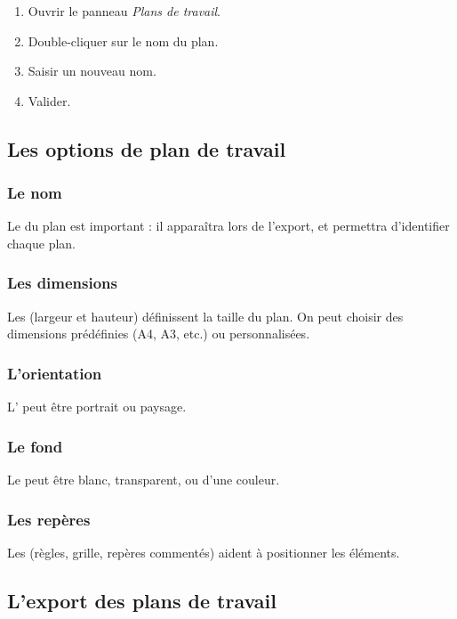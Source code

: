 \begin{enumerate}
    \item Ouvrir le panneau \emph{Plans de travail}.
    \item Double-cliquer sur le nom du plan.
    \item Saisir un nouveau nom.
    \item Valider.
\end{enumerate}

\subsection{Les options de plan de travail}

\subsubsection{Le nom}

Le  du plan est important : il apparaîtra lors de l'export, et permettra d'identifier chaque plan.

\subsubsection{Les dimensions}

Les  (largeur et hauteur) définissent la taille du plan. On peut choisir des dimensions prédéfinies (A4, A3, etc.) ou personnalisées.

\subsubsection{L'orientation}

L' peut être portrait ou paysage.

\subsubsection{Le fond}

Le  peut être blanc, transparent, ou d'une couleur.

\subsubsection{Les repères}

Les  (règles, grille, repères commentés) aident à positionner les éléments.

\subsection{L'export des plans de travail}

